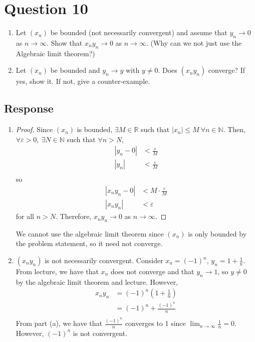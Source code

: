 \documentclass[13pt]{article}
\begin{document}
\newpage
\section*{Question 10}
\begin{enumerate}[label=(\alph*)]
\item Let $(x_n)$ be bounded (not necessarily convergent) and assume that
  $y_n \rightarrow 0$ as $n \rightarrow \infty$. Show that $x_ny_n
  \rightarrow 0 $ as $n \rightarrow \infty$. (Why can we not just use
  the Algebraic limit theorem?)
\item Let $(x_n)$ be bounded and $y_n \rightarrow y$ with $y \neq
  0$. Does $(x_ny_n)$ converge? If yes, show it. If not, give a counter-example.
\end{enumerate}

\subsection*{Response}
\begin{enumerate}[label=(\alph*)]
\item
  \begin{proof}
    Since $(x_n)$ is bounded, $\exists M \in \mathbb{R}$ such that
    $|x_n| \leq M \ \forall n \in \mathbb{N}$. Then, $\forall \varepsilon > 0, \
    \exists N \in \mathbb{N}$ such that $\forall n > N$,
    \begin{align*}
      |y_n - 0| &< \frac{\varepsilon}{M} \\
      |y_n| &< \frac{\varepsilon}{M} \\
    \end{align*}
    so
    \begin{align*}
      |x_ny_n - 0| &< M \cdot \frac{\varepsilon}{M} \\
      |x_ny_n| &< \varepsilon
    \end{align*}
    for all $n > N$. Therefore, $x_ny_n \rightarrow 0$ as $n
    \rightarrow \infty$.
  \end{proof}
  We cannot use the algebraic limit theorem since $(x_n)$ is only bounded
  by the problem statement, so it need not converge.
  
\item $(x_ny_n)$ is not necessarily convergent. Consider $x_n =
  (-1)^n$, $y_n = 1 + \frac{1}{n}$. From lecture, we have that $x_n$
  does not converge and that $y_n \rightarrow 1$, so $y \neq 0$ by the algebraic
  limit theorem and lecture. However,
  \begin{align*}
    x_ny_n &= (-1)^n(1 + \frac{1}{n}) \\
           &= (-1)^n + \frac{(-1)^n}{n} \\
  \end{align*}
  From part (a), we have that $\frac{(-1)^n}{n}$ converges to 1 since
  $\lim_{n \rightarrow \infty} \frac{1}{n} = 0$. However, $(-1)^n$ is
  not convergent.
\end{enumerate}
\end{document}
